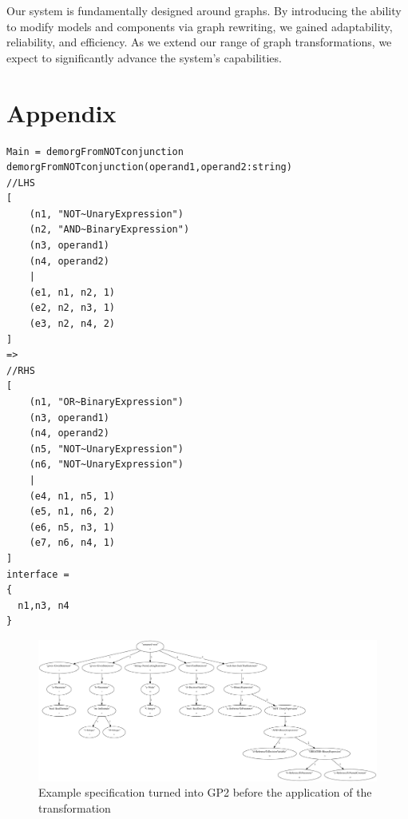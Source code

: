 \documentclass[runningheads]{llncs}
\begin{document}
Our system is fundamentally designed around graphs. By introducing the ability to modify models and components via graph rewriting, we gained adaptability, reliability, and efficiency. As we extend our range of graph transformations, we expect to significantly advance the system's capabilities.

\newpage





\appendix

\section{Appendix}

\begin{lstlisting}[caption={A De Morgan rule implemented in GP2},label={lst:demorgGP2}]
Main = demorgFromNOTconjunction
demorgFromNOTconjunction(operand1,operand2:string)
//LHS
[
    (n1, "NOT~UnaryExpression")
    (n2, "AND~BinaryExpression")
    (n3, operand1)
    (n4, operand2)
    |
    (e1, n1, n2, 1)
    (e2, n2, n3, 1)
    (e3, n2, n4, 2)
]
=>
//RHS
[
    (n1, "OR~BinaryExpression")
    (n3, operand1)
    (n4, operand2)
    (n5, "NOT~UnaryExpression")
    (n6, "NOT~UnaryExpression")
    |
    (e4, n1, n5, 1)
    (e5, n1, n6, 2)
    (e6, n5, n3, 1)
    (e7, n6, n4, 1)
]
interface =
{
  n1,n3, n4
}

\end{lstlisting}

\begin{figure}[htb]
\begin{center}
\includegraphics[angle=90,height=0.9\textheight,width=\textwidth]{demorg-BEFORE.pdf}
\caption{Example specification turned into GP2 before the application of the transformation}
\end{center}
\label{fig:demorg-BEFORE}
\end{figure}
\end{document}
